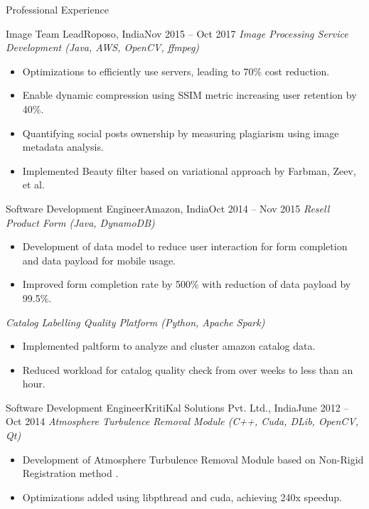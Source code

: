 \documentclass[]{mcdowellcv}
\begin{document}
\begin{cvsection}{Professional Experience}
        \begin{cvsubsection}{Image Team Lead}{Roposo, India}{Nov 2015 -- Oct 2017}        
        \textit{Image Processing Service Development (Java, AWS, OpenCV, ffmpeg)}
            \begin{itemize}
                \item Optimizations to efficiently use servers, leading to 70\% cost reduction.
                \item Enable dynamic compression using SSIM metric increasing user retention by 40\%.
                \item Quantifying social posts ownership by measuring plagiarism using image metadata analysis.
                \item Implemented Beauty filter based on variational approach by Farbman, Zeev, et al. \cite{farbman2008edge}
            \end{itemize}
        \end{cvsubsection}
          
        \begin{cvsubsection}{Software Development Engineer}{Amazon, India}{Oct 2014 -- Nov 2015}        
        \textit{Resell Product Form (Java, DynamoDB)}
            \begin{itemize}
                \item Development of data model to reduce user interaction for form completion and data payload for mobile usage.
                \item Improved form completion rate by 500\% with reduction of data payload by 99.5\%.
            \end{itemize}

        \textit{Catalog Labelling Quality Platform (Python, Apache Spark)}
            \begin{itemize}
            \item Implemented paltform to analyze and cluster amazon catalog data.
            \item Reduced workload for catalog quality check from over weeks to less than an hour.
           \end{itemize}
        \end{cvsubsection}

        \begin{cvsubsection}{Software Development Engineer}{KritiKal Solutions Pvt. Ltd., India}{June 2012 -- Oct 2014}
            \textit{Atmosphere Turbulence Removal Module (C++, Cuda, DLib, OpenCV, Qt)}
            \begin{itemize}
                \item Development of Atmosphere Turbulence Removal Module based on Non-Rigid Registration method \cite{rueckert1999nonrigid}.
                \item Optimizations added using libpthread and cuda, achieving 240x speedup.
            \end{itemize}


\end{cvsubsection}
\end{cvsection}
\end{document}
